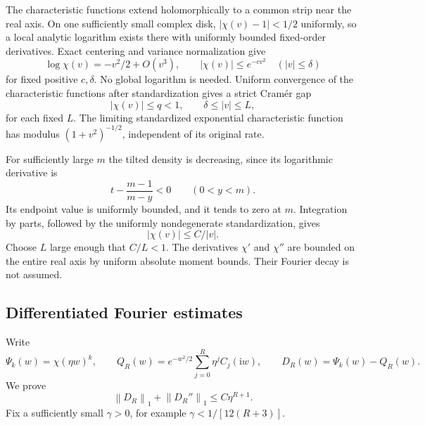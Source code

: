 \documentclass[11pt]{article}
\numberwithin{equation}{section}
\theoremstyle{remark}\newtheorem{remark}[theorem]{Remark}
\newcommand{\ii}{\mathrm i}\newcommand{\sgn}{\operatorname{sgn}}
\newcommand{\norm}[2]{\left\lVert #1\right\rVert_{#2}}
\begin{document}
The characteristic functions extend holomorphically to a common
strip near the real axis.  On one sufficiently small complex disk,
$|\chi(v)-1|<1/2$ uniformly, so a local analytic logarithm exists there
with uniformly bounded fixed-order derivatives.  Exact centering and
variance normalization give
\[
 \log\chi(v)=-v^2/2+O(v^3),\qquad
 |\chi(v)|\le e^{-cv^2}\quad (|v|\le\delta)
\]
for fixed positive $c,\delta$.  No global logarithm is needed.
Uniform convergence of the characteristic functions after
standardization gives a strict Cram\'er gap
\begin{equation}\label{brs:un:eq:annulus}
 |\chi(v)|\le q<1,\qquad \delta\le|v|\le L,
\end{equation}
for each fixed $L$.  The limiting standardized exponential
characteristic function has modulus $(1+v^2)^{-1/2}$, independent
of its original rate.

For sufficiently large $m$ the tilted density is decreasing, since
its logarithmic derivative is
\[
 t-\frac{m-1}{m-y}<0\qquad (0<y<m).
\]
Its endpoint value is uniformly bounded, and it tends to zero at
$m$.  Integration by parts, followed by the uniformly nondegenerate
standardization, gives
\begin{equation}\label{brs:un:eq:decay}
 |\chi(v)|\le C/|v|.
\end{equation}
Choose $L$ large enough that $C/L<1$.  The derivatives
$\chi'$ and $\chi''$ are bounded on the entire real axis by uniform
absolute moment bounds.  Their Fourier decay is not assumed.

\subsection{Differentiated Fourier estimates}

Write
\begin{equation}\label{brs:un:eq:Fourier}
 \Psi_k(w)=\chi(\eta w)^k,\qquad
 Q_R(w)=e^{-w^2/2}\sum_{j=0}^R\eta^j C_j(\ii w),\qquad
 D_R(w)=\Psi_k(w)-Q_R(w).
\end{equation}
We prove
\begin{equation}\label{brs:un:eq:DL1}
 \norm{D_R}{1}+\norm{D_R''}{1}\le C\eta^{R+1}.
\end{equation}
Fix a sufficiently small $\gamma>0$, for example
$\gamma<1/[12(R+3)]$.
\end{document}
